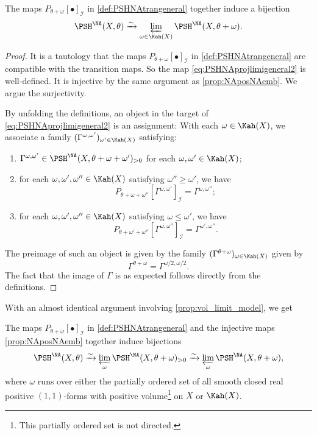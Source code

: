 \begin{proposition}\label{prop:NApotential:L222}
    The maps $P_{\theta+\omega}[\bullet]_{\mathcal{I}}$ in \cref{def:PSHNAtrangeneral} together induce a bijection
    \begin{equation}\label{eq:PSHNAprojlimigeneral2}
    \PSH^{\NA}(X,\theta)\xrightarrow{\sim} \varprojlim_{\omega\in \Kah(X)}\PSH^{\NA}(X,\theta+\omega).
    \end{equation}
\end{proposition}
\begin{proof}
    It is a tautology that the maps $P_{\theta+\omega}[\bullet]_{\mathcal{I}}$ in \cref{def:PSHNAtrangeneral} are compatible with the transition maps. So the map \eqref{eq:PSHNAprojlimigeneral2} is well-defined. It is injective by the same argument as \cref{prop:NAposNAemb}. We argue the surjectivity.

    By unfolding the definitions, an object in the target of \eqref{eq:PSHNAprojlimigeneral2} is an assignment: With each $\omega\in \Kah(X)$, we associate a family $(\Gamma^{\omega,\omega'})_{\omega'\in \Kah(X)}$ satisfying:
    \begin{enumerate}
        \item\label{itm:chapter-NApotential:L242:1} $\Gamma^{\omega,\omega'}\in \PSH^{\NA}(X,\theta+\omega+\omega')_{>0}$ for each $\omega,\omega'\in \Kah(X)$;
        \item\label{itm:chapter-NApotential:L242:2} for each $\omega,\omega',\omega''\in \Kah(X)$ satisfying $\omega''\geq \omega'$, we have
        \[
        P_{\theta+\omega+\omega''}\left[\Gamma^{\omega,\omega'}\right]_{\mathcal{I}}=\Gamma^{\omega,\omega''};
        \]
        \item\label{itm:chapter-NApotential:L242:3} for each $\omega,\omega',\omega''\in \Kah(X)$ satisfying $\omega\leq \omega'$, we have
        \[
        P_{\theta+\omega'+\omega''}\left[\Gamma^{\omega,\omega''}\right]_{\mathcal{I}}=\Gamma^{\omega',\omega''}.
        \]
    \end{enumerate}
    The preimage of such an object is given by the family $(\Gamma^{\theta+\omega})_{\omega\in \Kah(X)}$ given by
    \[
        \Gamma^{\theta+\omega}=\Gamma^{\omega/2,\omega/2}.
    \]
    The fact that the image of $\Gamma$ is as expected follows directly from the definitions.
\end{proof}
With an almost identical argument involving \cref{prop:vol_limit_model}, we get
\begin{proposition}\label{prop:PSHNAreform1}
    The maps $P_{\theta+\omega}[\bullet]_{\mathcal{I}}$ in \cref{def:PSHNAtrangeneral} and the injective maps \cref{prop:NAposNAemb} together induce bijections
    \begin{equation}\label{eq:PSHNAprojlimigeneral}
    \PSH^{\NA}(X,\theta)\xrightarrow{\sim} \varprojlim_{\omega}\PSH^{\NA}(X,\theta+\omega)_{>0}\xrightarrow{\sim} \varprojlim_{\omega}\PSH^{\NA}(X,\theta+\omega),
    \end{equation}
    where $\omega$ runs over either the partially ordered set of all smooth closed real positive $(1,1)$-forms with positive volume\footnote{This partially ordered set is not directed.} on $X$ or $\Kah(X)$.
\end{proposition}

